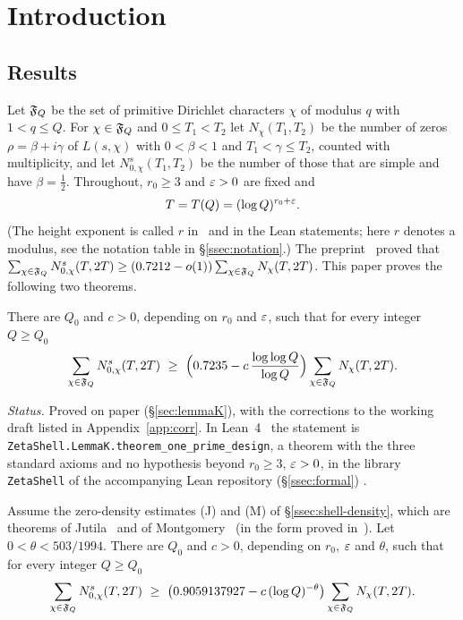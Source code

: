 \section{Introduction}\label{sec:intro}

\subsection{Results}\label{ssec:results}
Let $\mathfrak F_Q$ be the set of primitive Dirichlet characters $\chi$ of modulus $q$ with $1<q\le Q$. For $\chi\in\mathfrak F_Q$ and $0\le T_1<T_2$ let
$N_\chi(T_1,T_2)$ be the number of zeros $\rho=\beta+i\gamma$ of $L(s,\chi)$ with $0<\beta<1$ and $T_1<\gamma\le T_2$, counted with
multiplicity, and let $N^{s}_{0,\chi}(T_1,T_2)$ be the number of those that are simple and have $\beta=\frac12$. Throughout, $r_0\ge3$ and
$\varepsilon>0$ are fixed and
\[
T=T(Q)=(\log Q)^{r_0+\varepsilon}.
\]
(The height exponent is called $r$ in~\cite{DSouza} and in the Lean statements; here $r$ denotes a modulus, see the notation table
in \S\ref{ssec:notation}.) The preprint~\cite{DSouza} proved that $\sum_{\chi\in\mathfrak F_Q}N^s_{0,\chi}(T,2T)\ge(0.7212-o(1))\sum_{\chi\in\mathfrak F_Q}N_\chi(T,2T)$.
This paper proves the following two theorems.

\begin{theorem}\label{thm:one-prime}
There are $Q_0$ and $c>0$, depending on $r_0$ and $\varepsilon$, such that for every integer $Q\ge Q_0$
\[
\sum_{\chi\in\FQ}N^s_{0,\chi}(T,2T)\ \ge\ \Bigl(0.7235-c\,\frac{\log\log Q}{\log Q}\Bigr)\sum_{\chi\in\FQ}N_\chi(T,2T).
\]
\end{theorem}

\noindent\emph{Status.} Proved on paper (\S\ref{sec:lemmaK}), with the corrections to the working draft listed in Appendix~\ref{app:corr}. In
Lean~4~\cite{Lean4} the statement is \texttt{ZetaShell.LemmaK.theorem\_one\_prime\_design}, a theorem with the three standard axioms and no
hypothesis beyond $r_0\ge3$, $\varepsilon>0$, in the library \texttt{ZetaShell} of the accompanying Lean repository (\S\ref{ssec:formal}) \tagL.

\begin{theorem}\label{thm:shell}
Assume the zero-density estimates \textup{(J)} and \textup{(M)} of \S\ref{ssec:shell-density}, which are theorems of
Jutila~\cite[Theorem~1]{Jutila77} and of Montgomery~\cite{Montgomery69} (in the form proved in~\cite[Th\'eor\`eme~20]{BombieriAst18}).
Let $0<\theta<503/1994$. There are $Q_0$ and $c>0$, depending on $r_0$, $\varepsilon$ and $\theta$, such that for every integer $Q\ge Q_0$
\[
\sum_{\chi\in\FQ}N^s_{0,\chi}(T,2T)\ \ge\ \bigl(0.9059137927-c\,(\log Q)^{-\theta}\bigr)\sum_{\chi\in\FQ}N_\chi(T,2T).
\]
\end{theorem}

